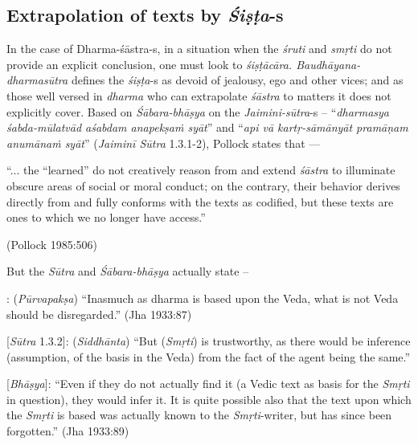 \subsection{Extrapolation of texts by {{\sl\bfseries Śiṣṭa}\relax}-s}\label{art12-sec3.6}

In the case of Dharma-śāstra-s, in a situation when the {\sl śruti} and {\sl smṛti} do not provide an explicit conclusion, one must look to {\sl śiṣṭācāra. Baudhāyana-dharmasūtra} deﬁnes the {\sl śiṣṭa}-s as devoid of jealousy, ego and other vices; and as those well versed in {\sl dharma} who can extrapolate {\sl śāstra} to matters it does not explicitly cover. Based on {\sl Śābara-bhāṣya} on the {\sl Jaimini-sūtra}-s -- ``{\sl dharmasya śabda-mūlatvād aśabdam anapekṣaṁ syāt}''  and ``{\sl api vā kartṛ-sāmānyāt pramāṇam anumānaṁ syāt}'' ({\sl Jaiminī Sūtra} 1.3.1-2), Pollock states that ---

\begin{myquote}
``... the ``learned'' do not creatively reason from and extend {\sl śāstra} to illuminate obscure areas of social or moral conduct; on the contrary, their behavior derives directly from and fully conforms with the texts as codiﬁed, but these texts are ones to which we no longer have access.'' 

\hfill (Pollock 1985:506)
\end{myquote}

But the {\sl Sūtra} and {\sl Śābara-bhāṣya} actually state --
\begin{myquote}
[{\sl Sūtra} 1.3.1]: ({\sl Pūrvapakṣa}) ``Inasmuch as dharma is based upon the Veda, what is not Veda should be disregarded.'' (Jha 1933:87) 

[{\sl Sūtra} 1.3.2]: ({\sl Siddhānta}) ``But ({\sl Smṛti}) is trustworthy, as there would be inference (assumption, of the basis in the Veda) from the fact of the agent being the same.'' 

[{\sl Bhāṣya}]: ``Even if they do not actually find it (a Vedic text as basis for the {\sl Smṛti} in question), they would infer it. It is quite possible also that the text upon which the {\sl Smṛti} is based was actually known to the {\sl Smṛti}-writer, but has since been forgotten.'' (Jha 1933:89)
\end{myquote}

